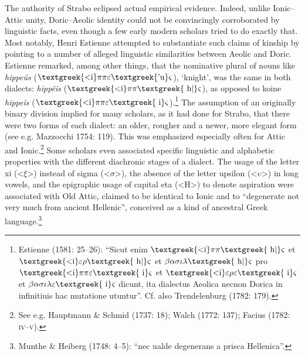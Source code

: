 \documentclass[12pt]{article}
\newenvironment{styleStandard}{\renewcommand\baselinestretch{1.25}\setlength\leftskip{0in}\setlength\rightskip{0in}\setlength\parindent{0.1972in}\setlength\parfillskip{0pt plus 1fil}\setlength\parskip{0in plus 1pt}\writerlistparindent\writerlistleftskip\leavevmode\normalfont\normalsize\writerlistlabel\ignorespaces}{\unskip\vspace{0in plus 1pt}\par}
\newcommand\writerlistleftskip{}
\newcommand\writerlistparindent{}
\newcommand\writerlistlabel{}
\begin{document}
\begin{styleStandard}
The authority of Strabo eclipsed actual empirical evidence. Indeed, unlike Ionic–Attic unity, Doric–Aeolic identity could not be convincingly corroborated by linguistic facts, even though a few early modern scholars tried to do exactly that. Most notably, Henri Estienne attempted to substantiate such claims of kinship by pointing to a number of alleged linguistic similarities between Aeolic and Doric. Estienne remarked, among other things, that the nominative plural of nouns like \textit{hippeús} ($\text{\textgreek{<i}}\pi \pi \varepsilon \text{\textgreek{'u}}\varsigma $), ‘knight’, was the same in both dialects: \textit{hippêis} ($\text{\textgreek{<i}}\pi \pi \text{\textgreek{~h|}}\varsigma $), as opposed to koine \textit{hippeîs} ($\text{\textgreek{<i}}\pi \pi \varepsilon \text{\textgreek{~i}}\varsigma $).\footnote{ Estienne (1581: 25–26): “Sicut enim $\text{\textgreek{<i}}\pi \pi \text{\textgreek{~h|}}\varsigma $ et $\text{\textgreek{<i}}\varepsilon \rho \text{\textgreek{~h|}}\varsigma $ et $\beta \alpha \sigma \iota \lambda \text{\textgreek{~h|}}\varsigma $ pro $\text{\textgreek{<i}}\pi \pi \varepsilon \text{\textgreek{~i}}\varsigma $ et $\text{\textgreek{<i}}\varepsilon \rho \varepsilon \text{\textgreek{~i}}\varsigma $ et $\beta \alpha \sigma \iota \lambda \varepsilon \text{\textgreek{~i}}\varsigma $ dicunt, ita dialectus Aeolica necnon Dorica in infinitiuis hac mutatione utuntur”. Cf. also Trendelenburg (1782: 179).} The assumption of an originally binary division implied for many scholars, as it had done for Strabo, that there were two forms of each dialect: an older, rougher and a newer, more elegant form (see e.g. Mazzocchi 1754: 119). This was emphasized especially often for Attic and Ionic.\footnote{ See e.g. Hauptmann \& Schmid (1737: 18); Walch (1772: 137); Facius (1782: \textsc{iv–v}).} Some scholars even associated specific linguistic and alphabetic properties with the different diachronic stages of a dialect. The usage of the letter xi ({\textless}$\xi ${\textgreater}) instead of sigma ({\textless}$\sigma ${\textgreater}), the absence of the letter upsilon ({\textless}$\upsilon ${\textgreater}) in long vowels, and the epigraphic usage of capital eta ({\textless}H{\textgreater}) to denote aspiration were associated with Old Attic, claimed to be identical to Ionic and to “degenerate not very much from ancient Hellenic”, conceived as a kind of ancestral Greek language.\footnote{ Munthe \& Heiberg (1748: 4–5): “nec ualde degenerans a prisca Hellenica”.}
\end{styleStandard}
\end{document}
